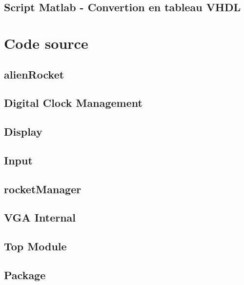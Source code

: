 \documentclass[french]{nakrule}
\begin{document}
\subsection{Script Matlab - Convertion en tableau VHDL}
\label{subsec:Script2}
\vspace{.1in}


\clearpage

\section{Code source}
\label{sec:code}

\subsection{alienRocket}


\clearpage
\subsection{Digital Clock Management}
%
\clearpage
\subsection{Display}
%
\clearpage
\subsection{Input}
%

\subsection{rocketManager}
%

\subsection{VGA Internal}
%
\clearpage
\subsection{Top Module}
%

\subsection{Package}
%
\end{document}

